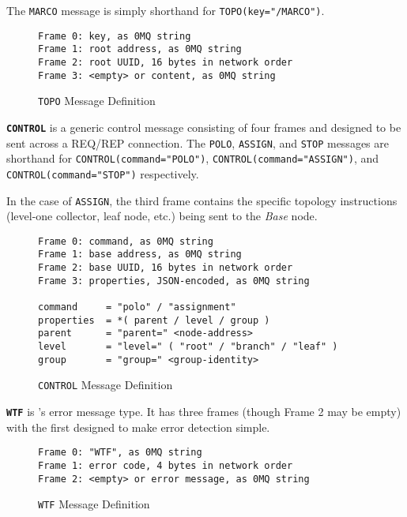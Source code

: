 The \texttt{MARCO} message is simply shorthand for \texttt{TOPO(key="/MARCO")}.

\begin{figure}[H]
\vspace{+10pt}
\begin{verbatim}
Frame 0: key, as 0MQ string
Frame 1: root address, as 0MQ string
Frame 2: root UUID, 16 bytes in network order
Frame 3: <empty> or content, as 0MQ string
\end{verbatim}
\vspace{-20pt}
\caption{\texttt{TOPO} Message Definition}
\label{fig:message_topo}
\end{figure}

\textbf{\texttt{CONTROL}} is a generic control message consisting of four frames and designed to be sent across a
REQ/REP connection. The \texttt{POLO}, \texttt{ASSIGN}, and \texttt{STOP} messages are shorthand for
\texttt{CONTROL(command="POLO")}, \texttt{CONTROL(command="ASSIGN")}, and \texttt{CONTROL(command="STOP")} respectively.

In the case of \texttt{ASSIGN}, the third frame contains the specific topology instructions (level-one collector, leaf
node, etc.) being sent to the \textit{Base} node.

\begin{figure}[H]
\vspace{+10pt}
\begin{verbatim}
Frame 0: command, as 0MQ string
Frame 1: base address, as 0MQ string
Frame 2: base UUID, 16 bytes in network order
Frame 3: properties, JSON-encoded, as 0MQ string

command     = "polo" / "assignment"
properties  = *( parent / level / group )
parent      = "parent=" <node-address>
level       = "level=" ( "root" / "branch" / "leaf" )
group       = "group=" <group-identity>
\end{verbatim}
\vspace{-20pt}
\caption{\texttt{CONTROL} Message Definition}
\label{fig:message_control}
\end{figure}

\textbf{\texttt{WTF}} is \dcampns's error message type. It has three frames (though Frame 2 may be empty) with the first
designed to make error detection simple.

\begin{figure}[H]
\vspace{+10pt}
\begin{verbatim}
Frame 0: "WTF", as 0MQ string
Frame 1: error code, 4 bytes in network order
Frame 2: <empty> or error message, as 0MQ string
\end{verbatim}
\vspace{-20pt}
\caption{\texttt{WTF} Message Definition}
\label{fig:message_wtf}
\end{figure}
